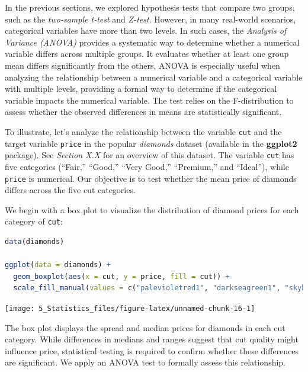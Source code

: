 \documentclass[
  11pt,
]{book}
\newcommand{\passthrough}[1]{#1}
\theoremstyle{definition}
\theoremstyle{definition}
\theoremstyle{definition}
\theoremstyle{definition}
\theoremstyle{remark}
\begin{document}
In the previous sections, we explored hypothesis tests that compare two groups, such as the \emph{two-sample t-test} and \emph{Z-test}. However, in many real-world scenarios, categorical variables have more than two levels. In such cases, the \emph{Analysis of Variance (ANOVA)} provides a systematic way to determine whether a numerical variable differs across multiple groups. It evaluates whether at least one group mean differs significantly from the others. ANOVA is especially useful when analyzing the relationship between a numerical variable and a categorical variable with multiple levels, providing a formal way to determine if the categorical variable impacts the numerical variable. The test relies on the F-distribution to assess whether the observed differences in means are statistically significant.

To illustrate, let's analyze the relationship between the variable \passthrough{\lstinline!cut!} and the target variable \passthrough{\lstinline!price!} in the popular \emph{diamonds} dataset (available in the \textbf{ggplot2} package). See \emph{Section X.X} for an overview of this dataset. The variable \passthrough{\lstinline!cut!} has five categories (``Fair,'' ``Good,'' ``Very Good,'' ``Premium,'' and ``Ideal''), while \passthrough{\lstinline!price!} is numerical. Our objective is to test whether the mean price of diamonds differs across the five cut categories.

We begin with a box plot to visualize the distribution of diamond prices for each category of \passthrough{\lstinline!cut!}:

\begin{lstlisting}[language=R]
data(diamonds)   

ggplot(data = diamonds) + 
  geom_boxplot(aes(x = cut, y = price, fill = cut)) +
  scale_fill_manual(values = c("palevioletred1", "darkseagreen1", "skyblue1", "gold1", "lightcoral"))
\end{lstlisting}

\begin{center}\texttt{[image: 5\_Statistics\_files/figure-latex/unnamed-chunk-16-1]} \end{center}

The box plot displays the spread and median prices for diamonds in each cut category. While differences in medians and ranges suggest that cut quality might influence price, statistical testing is required to confirm whether these differences are significant. We apply an ANOVA test to formally assess this relationship.
\end{document}
